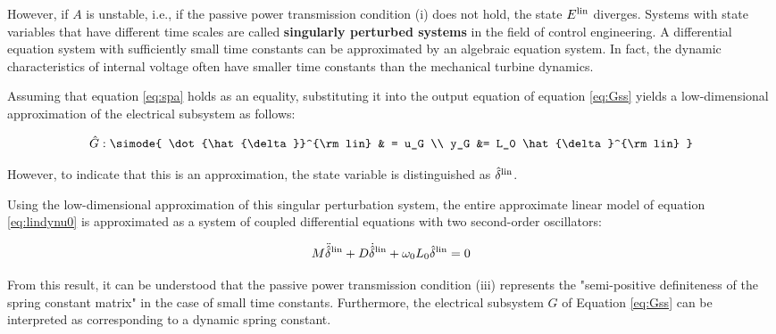 \documentclass[graybox, envcountchap]{svmult}
\begin{document}
However, if $A$ is unstable, i.e., if the passive power transmission condition
(i) does not hold, the state $E^{\rm lin}$ diverges. Systems with state
variables that have different time scales are called \textbf{singularly
perturbed systems} \cite{kokotovic1987singular} in the field of control
engineering. A differential equation system with sufficiently small time
constants can be approximated by an algebraic equation system. In fact, the
dynamic characteristics of internal voltage often have smaller time constants
than the mechanical turbine dynamics.

Assuming that equation \ref{eq:spa} holds as an equality, substituting it into
the output equation of equation \ref{eq:Gss} yields a low-dimensional
approximation of the electrical subsystem as follows:

\begin{equation}\label{eq:Gsssp}
  \hat{G}: \simode{
    \dot{\hat{\delta}}^{\rm lin} & = u_G \\
    y_G &= L_0 \hat{\delta}^{\rm lin}
  }
\end{equation}

However, to indicate that this is an approximation, the state variable is
distinguished as $\hat{\delta}^{\rm lin}$.

Using the low-dimensional approximation of this singular perturbation system,
the entire approximate linear model of equation \ref{eq:lindynu0} is
approximated as a system of coupled differential equations with two second-order
oscillators:

\begin{equation}\label{eq:spamodel}
  M \ddot{\hat{\delta}}^{\rm lin}
  + D \dot{\hat{\delta}}^{\rm lin}
  +\omega_0 L_0 \hat{\delta}^{\rm lin}=0
\end{equation}

From this result, it can be understood that the passive power transmission
condition (iii) represents the "semi-positive definiteness of the spring
constant matrix" in the case of small time constants. Furthermore, the
electrical subsystem $G$ of Equation \ref{eq:Gss} can be interpreted as
corresponding to a dynamic spring constant.
\end{document}
